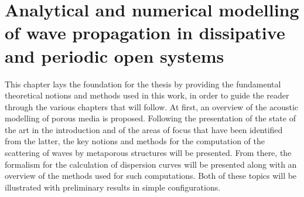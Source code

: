 \chapter
    [Modelling of propagation in dissipative and periodic systems]
    {Analytical and numerical modelling of wave propagation in dissipative and periodic open systems}
\label{chap:chap1}

This chapter lays the foundation for the thesis by providing the fundamental theoretical notions and methods used in this work, in order to guide the reader through the various chapters that will follow. At first, an overview of the acoustic modelling of porous media is proposed. Following the presentation of the state of the art in the introduction and of the areas of focus that have been identified from the latter, the key notions and methods for the computation of the scattering of waves by metaporous structures will be presented. From there, the formalism for the calculation of dispersion curves will be presented along with an overview of the methods used for such computations. Both of these topics will be illustrated with preliminary results in simple configurations. 



